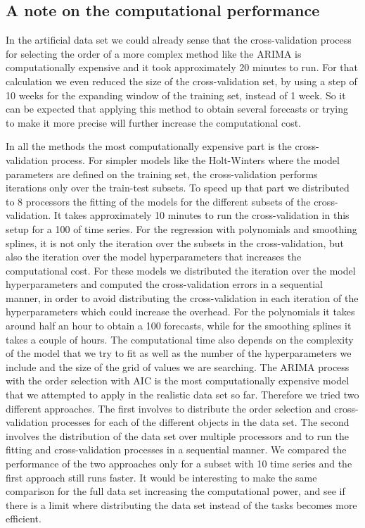 \documentclass[12pt, letterpaper]{article}\usepackage[]{graphicx}\usepackage[]{color}
\begin{document}
\subsection{A note on the computational performance}
In the artificial data set we could already sense that the cross-validation process for selecting the order of a more complex method like the ARIMA is computationally expensive and it took approximately 20 minutes to run. For that calculation we even reduced the size of the cross-validation set, by using a step of 10 weeks for the expanding window of the training set, instead of 1 week. So it can be expected that applying this method to obtain several forecasts or trying to make it more precise will further increase the computational cost.

In all the methods the most computationally expensive part is the cross-validation process. For simpler models like the Holt-Winters where the model parameters are defined on the training set, the cross-validation performs iterations only over the train-test subsets. To speed up that part we distributed to 8 processors the fitting of the models for the different subsets of the cross-validation. It takes approximately 10 minutes to run the cross-validation in this setup for a 100 of time series. For the regression with polynomials and smoothing splines, it is not only the iteration over the subsets in the cross-validation, but also the iteration over the model hyperparameters that increases the computational cost. For these models we distributed the iteration over the model hyperparameters and computed the cross-validation errors in a sequential manner, in order to avoid distributing the cross-validation in each iteration of the hyperparameters which could increase the overhead. For the polynomials it takes around half an hour to obtain a 100 forecasts, while for the smoothing splines it takes a couple of hours. The computational time also depends on the complexity of the model that we try to fit as well as the number of the hyperparameters we include and the size of the grid of values we are searching. The ARIMA process with the order selection with AIC is the most computationally expensive model that we attempted to apply in the realistic data set so far. Therefore we tried two different approaches. The first involves to distribute the order selection and cross-validation processes for each of the different objects in the data set. The second involves the distribution of the data set over multiple processors and to run the fitting and cross-validation processes in a sequential manner. We compared the performance of the two approaches only for a subset with 10 time series and the first approach still runs faster. It would be interesting to make the same comparison for the full data set increasing the computational power, and see if there is a limit where distributing the data set instead of the tasks becomes more efficient.
\end{document}
